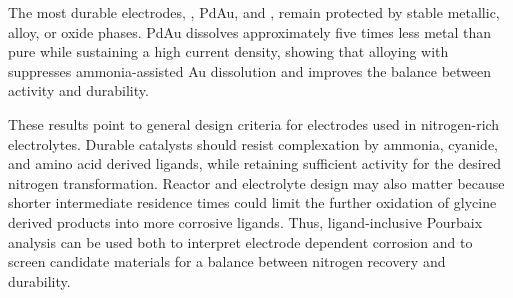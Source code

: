 \documentclass[twoside,twocolumn,9pt]{article}
\begin{document}
The most durable electrodes, , PdAu, and , remain protected by stable metallic, alloy, or oxide phases. PdAu dissolves approximately five times less metal than pure  while sustaining a high current density, showing that alloying with  suppresses ammonia-assisted Au dissolution and improves the balance between activity and durability.

These results point to general design criteria for electrodes used in nitrogen-rich electrolytes. Durable catalysts should resist complexation by ammonia, cyanide, and amino acid derived ligands, while retaining sufficient activity for the desired nitrogen transformation. Reactor and electrolyte design may also matter because shorter intermediate residence times could limit the further oxidation of glycine derived products into more corrosive ligands. Thus, ligand-inclusive Pourbaix analysis can be used both to interpret electrode dependent corrosion and to screen candidate materials for a balance between nitrogen recovery and durability.

\end{document}
